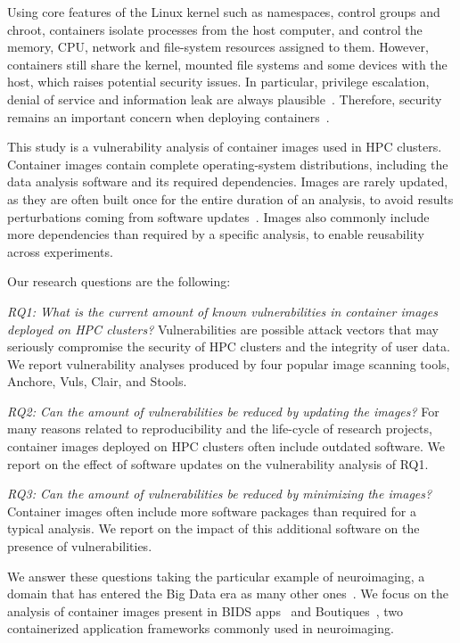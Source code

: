 \documentclass[a4paper,num-refs]{oup-contemporary}
\begin{document}
Using core features of the Linux kernel such as namespaces, control groups
and chroot, containers isolate processes from the
host computer,  
and control the memory, CPU, network and file-system resources assigned to
them. However, containers still share the kernel, mounted file systems and
some devices with the host, which raises potential security issues. In
particular, privilege escalation, denial of service and information leak
are always plausible~\cite{gantikow2016providing}. Therefore, security remains 
an important concern when deploying containers~\cite{bettini2015vulnerability}.

This study is a vulnerability analysis of container images used in HPC
clusters. Container images contain complete operating-system distributions, including
the data analysis software and its required dependencies.
Images are rarely updated, as they are often built once
for the entire duration of an analysis, to avoid results perturbations
coming from software updates~\cite{gronenschild2012effects, glatard2015reproducibility}. Images also
commonly include more dependencies than required by a specific analysis, to 
enable reusability across experiments.

Our research questions are the following:

\textit{RQ1: What is the current amount of known vulnerabilities in
container images deployed on HPC clusters?} Vulnerabilities are possible
attack vectors that may seriously compromise the security of HPC clusters
and the integrity of user data. We report vulnerability analyses produced
by four popular image scanning tools, Anchore, Vuls, Clair, and Stools.

\textit{RQ2: Can the amount of vulnerabilities be reduced by updating the images?}  
For many reasons related to reproducibility and the life-cycle of research
projects, container images deployed on HPC clusters often include outdated
software. We report on the effect of software updates on the vulnerability
analysis of RQ1.

\textit{RQ3: Can the amount of vulnerabilities be reduced by minimizing the images?} 
Container images often include more software packages than required for a
typical analysis. We report on the impact of this additional software on
the presence of vulnerabilities.

We answer these questions taking the particular example of neuroimaging, a
domain that has entered the Big Data era as many other
ones~\cite{van2014human}. We focus on the analysis of container images
present in BIDS apps~\cite{gorgolewski2017bids} and Boutiques~\cite{glatard2018boutiques}, two containerized
application frameworks commonly used in neuroimaging. 
\end{document}
